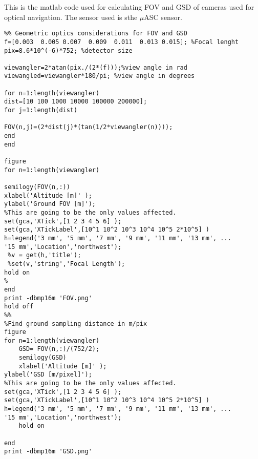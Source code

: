 \label{app:majamatlab}

This is the matlab code used for calculating FOV and GSD of cameras used for optical navigation. The sensor used is sthe $\mu$ASC sensor. 

\begin{lstlisting}
%% Geometric optics considerations for FOV and GSD 
f=[0.003  0.005 0.007  0.009  0.011  0.013 0.015]; %Focal lenght
pix=8.6*10^(-6)*752; %detector size

viewangler=2*atan(pix./(2*(f)));%view angle in rad
viewangled=viewangler*180/pi; %view angle in degrees

for n=1:length(viewangler)
dist=[10 100 1000 10000 100000 200000];
for j=1:length(dist)

FOV(n,j)=(2*dist(j)*(tan(1/2*viewangler(n))));
end 
end 

figure
for n=1:length(viewangler)

semilogy(FOV(n,:))
xlabel('Altitude [m]' );
ylabel('Ground FOV [m]');
%This are going to be the only values affected.
set(gca,'XTick',[1 2 3 4 5 6] ); 
set(gca,'XTickLabel',[10^1 10^2 10^3 10^4 10^5 2*10^5] )
h=legend('3 mm', '5 mm', '7 mm', '9 mm', '11 mm', '13 mm', ...
'15 mm','Location','northwest');
 %v = get(h,'title');
 %set(v,'string','Focal Length');
hold on
%
end 
print -dbmp16m 'FOV.png'
hold off
%%
%Find ground sampling distance in m/pix
figure
for n=1:length(viewangler)
    GSD= FOV(n,:)/(752/2); 
    semilogy(GSD)
    xlabel('Altitude [m]' );
ylabel('GSD [m/pixel]');
%This are going to be the only values affected.
set(gca,'XTick',[1 2 3 4 5 6] );
set(gca,'XTickLabel',[10^1 10^2 10^3 10^4 10^5 2*10^5] )
h=legend('3 mm', '5 mm', '7 mm', '9 mm', '11 mm', '13 mm', ...
'15 mm','Location','northwest');
    hold on 
    
end
print -dbmp16m 'GSD.png'

\end{lstlisting}

